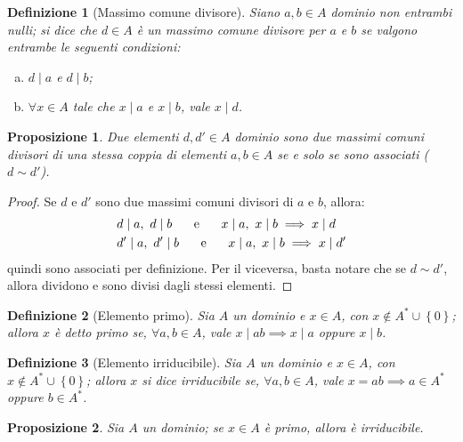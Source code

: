 \documentclass[12pt]{scrartcl}
\theoremstyle{style}
\newtheorem{definizione}{Definizione}[section]
\newtheorem{prop}{Proposizione}[section]
\numberwithin{equation}{subsection}
\begin{document}
\begin{definizione}
	[Massimo comune divisore]
	Siano $a,b \in A$ dominio non entrambi nulli; si dice che $d \in A$ \`e un \textit{massimo comune divisore} per $a$ e $b$ se valgono entrambe le seguenti condizioni:
	\begin{enumerate}[(a).]
		\item $d  \mid a$ e $d \mid b$;
		\item $\forall x \in A$ tale che $x \mid a$ e $x \mid b$, vale $x \mid d$.
	\end{enumerate}
\end{definizione}
\begin{prop}
	Due elementi $d,d' \in A$ dominio sono due massimi comuni divisori di una stessa coppia di elementi $a,b\in A$ se e solo se sono associati ($d \sim d'$).
\end{prop}
	\begin{proof}
		Se $d$ e $d'$ sono due massimi comuni divisori di $a$ e $b$, allora:
		\[
		\begin{split}
			&d \mid a, \ d  \mid b \hspace{.5cm} \text{ e } \hspace{.5cm} x \mid a, \ x  \mid b \implies x \mid d\\
			&d' \mid a, \ d'  \mid b \hspace{.5cm} \text{ e } \hspace{.5cm} x \mid a, \ x  \mid b \implies x \mid d'
		\end{split}
		\] 
		quindi sono associati per definizione.
		Per il viceversa, basta notare che se $d \sim d'$, allora dividono e sono divisi dagli stessi elementi.
	\end{proof}
\begin{definizione}
	[Elemento primo]	
	Sia $A$ un dominio e $x \in A$, con $x \not \in A^* \cup \left\{ 0 \right\} $; allora $x$ \`e detto \textit{primo} se, $\forall a,b\in A$, vale $x  \mid ab \implies x  \mid a$ oppure $x \mid b$.
\end{definizione}
\begin{definizione}
	[Elemento irriducibile]
	Sia $A$ un dominio e $x \in A$, con $x \not \in A^* \cup \left\{ 0 \right\} $; allora $x$ si dice \textit{irriducibile} se, $\forall a,b \in A$, vale $x = ab\implies a \in A^*$ oppure $b \in A^*$.
\end{definizione}
\begin{prop}\label{pimpp}
	Sia $A$ un dominio; se $x \in A$ \`e primo, allora \`e irriducibile.
\end{prop}
\end{document}
